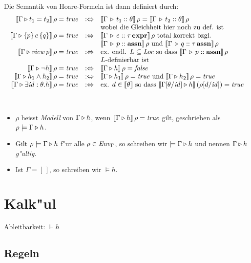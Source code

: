 \documentclass[12pt,a4paper,bigheadings]{scrartcl}
\newcommand{\semantic}[1]{\ensuremath{\llbracket#1\rrbracket}}
\newcommand{\assn}{\ensuremath{\mathbf{assn}}}
\newcommand{\atype}[1]{#1\,\assn}
\newcommand{\bexpr}{\ensuremath{\mathbf{expr}}}
\newcommand{\etype}[1]{#1\,\bexpr}
\newcommand{\view}[1]{\ensuremath{\app{\name{view}}{#1}}}
\begin{document}
\noindent
Die Semantik von Hoare-Formeln ist dann definiert durch:
\[\begin{array}{rcl}
  \semantic{\Tjh{\Gamma}{t_1 = t_2}}\,\rho = \true
  & :\Leftrightarrow &
  \semantic{\Tj{\Gamma}{t_1}{\theta}}\,\rho = \semantic{\Tj{\Gamma}{t_2}{\theta}}\,\rho \\
  && \text{wobei die Gleichheit hier noch zu def. ist}
  \\
  \semantic{\Tjh{\Gamma}{\triple{p}{e}{q}}}\,\rho = \true
  & :\Leftrightarrow &
  \semantic{\Tj{\Gamma}{e}{\etype{\tau}}}\,\rho \text{ total korrekt bzgl. } \\
  && \semantic{\Tj{\Gamma}{p}{\assn}}\,\rho \text{ und } \semantic{\Tj{\Gamma}{q}{\atype{\tau}}}\,\rho
  \\
  \semantic{\Tjh{\Gamma}{\view{p}}}\,\rho = \true
  & :\Leftrightarrow &
  \text{ex. endl. } L \subseteq \Loc \text{ so dass } \semantic{\Tj{\Gamma}{p}{\assn}}\,\rho \\
  && \text{$L$-definierbar ist}
  \\
  \semantic{\Tjh{\Gamma}{\neg h}}\,\rho = \true
  & :\Leftrightarrow &
  \semantic{\Tjh{\Gamma}{h}}\,\rho = \false
  \\
  \semantic{\Tjh{\Gamma}{h_1 \wedge h_2}}\,\rho = \true
  & :\Leftrightarrow &
  \semantic{\Tjh{\Gamma}{h_1}}\,\rho = \true \text{ und }
  \semantic{\Tjh{\Gamma}{h_2}}\,\rho = \true
  \\
  \semantic{\Tjh{\Gamma}{\exists \id:\theta.h}}\,\rho = \true
  & :\Leftrightarrow &
  \text{ex. } d \in \semantic{\theta} \text{ so dass }
  \semantic{\Tjh{\Gamma[\theta/\id]}{h}}\,(\rho[d/\id])=\true
\end{array}\]

\pagebreak[3]
\begin{definition}[Modell] \
  \begin{itemize}
    \item $\rho$ heisst {\em Modell} von $\Gamma \triangleright h$, wenn $\semantic{\Tjh{\Gamma}{h}}\,\rho = \true$
          gilt, geschrieben als $\rho \models \Gamma \triangleright h$.
    \item Gilt $\rho \models \Gamma \triangleright h$ f"ur alle $\rho\in{\text{\it Env\/}}_\Gamma$, so schreiben wir
          $\models \Gamma \triangleright h$ und nennen  $\Gamma \triangleright h$ {\em g"ultig}.
    \item Ist $\Gamma = [\,]$, so schreiben wir $\models h$.
  \end{itemize}
\end{definition}


\section{Kalk"ul}

Ableitbarkeit: $\vdash h$

\subsection{Regeln}
\end{document}
